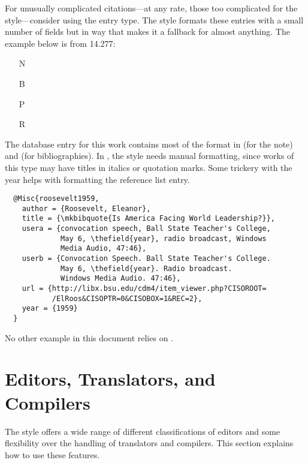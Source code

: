 \documentclass[11pt,letterpaper,oneside]{article}
\begin{document}
For unusually complicated ci\-ta\-tions---at any rate, those too
complicated for the style---consider using the  entry
type. The style formats these entries with a small number of fields
but in way that makes it a fallback for almost anything. The example
below is from 14.277:

\begin{itemize}
\item[N] 

\item[B] 

\item[P] 

\item[R] 
\end{itemize}

\noindent The database entry for this work contains most of the format
in  (for the note) and  (for
bibliographies). In , the style needs manual
formatting, since works of this type may have titles in italics or
quotation marks. Some trickery with the year helps with formatting the
reference list entry.

\begin{lstlisting}
  @Misc{roosevelt1959,
    author = {Roosevelt, Eleanor},
    title = {\mkbibquote{Is America Facing World Leadership?}},
    usera = {convocation speech, Ball State Teacher's College,
             May 6, \thefield{year}, radio broadcast, Windows
             Media Audio, 47:46},
    userb = {Convocation Speech. Ball State Teacher's College.
             May 6, \thefield{year}. Radio broadcast.
             Windows Media Audio. 47:46},
    url = {http://libx.bsu.edu/cdm4/item_viewer.php?CISOROOT=
           /ElRoos&CISOPTR=0&CISOBOX=1&REC=2},
    year = {1959}
  }
\end{lstlisting}

\noindent No other example in this document relies on .

\section{Editors, Translators, and Compilers}
\label{edtrans}

The style offers a wide range of different classifications of editors
and some flexibility over the handling of translators and compilers.
This section explains how to use these features.
\end{document}
